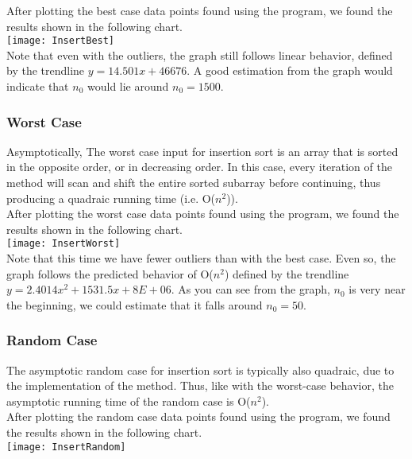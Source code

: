 \documentclass[12pt]{article}
\begin{document}
After plotting the best case data points found using the program, we found the results shown in the following chart. \\

\texttt{[image: InsertBest]}\\

Note that even with the outliers, the graph still follows linear behavior, defined by the trendline $y = 14.501x + 46676$. A good estimation from the graph would indicate that $n_0$ would lie around $n_0 = 1500$.
 
\subsubsection*{Worst  Case}

Asymptotically, The worst case input for insertion sort is an array that is sorted in the opposite order, or in decreasing order. In this case, every iteration of the method will scan and shift the entire sorted subarray before continuing, thus producing a quadraic running time (i.e. O($n^2$)).\\

After plotting the worst case data points found using the program, we found the results shown in the following chart.\\

\texttt{[image: InsertWorst]}\\

Note that this time we have fewer outliers than with the best case. Even so, the graph follows the predicted behavior of O($n^2$) defined by the trendline $y = 2.4014x^2 + 1531.5x + 8E+06$. As you can see from the graph, $n_0$ is very near the beginning, we could estimate that it falls around $n_0 = 50$.

\subsubsection*{Random Case}
The asymptotic random case for insertion sort is typically also quadraic, due to the implementation of the method. Thus, like with the worst-case behavior, the asymptotic running time of the  random case is O($n^2$).\\

After plotting the random case data points found using the program, we found the results shown in the following chart. \\


\texttt{[image: InsertRandom]}\\
\end{document}
